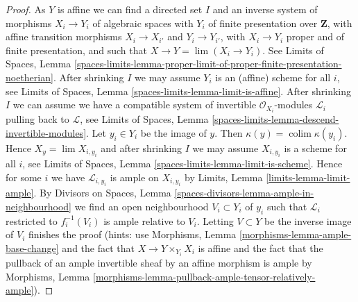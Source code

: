 \documentclass[10pt,a4paper]{amsart}
\theoremstyle{plain}
\theoremstyle{definition}
\theoremstyle{remark}
\numberwithin{equation}{subsection}
\def\lim{\mathop{\mathrm{lim}}\nolimits}
\def\colim{\mathop{\mathrm{colim}}\nolimits}
\begin{document}
\begin{proof}
\medskip\noindent
As $Y$ is affine we can find a directed set $I$ and an
inverse system of morphisms $X_i \to Y_i$ of algebraic spaces
with $Y_i$ of finite presentation over $\mathbf{Z}$, with affine
transition morphisms $X_i \to X_{i'}$ and $Y_i \to Y_{i'}$,
with $X_i \to Y_i$ proper and of finite presentation, and such that
$X \to Y = \lim (X_i \to Y_i)$. See Limits of Spaces, Lemma
\ref{spaces-limits-lemma-proper-limit-of-proper-finite-presentation-noetherian}.
After shrinking $I$ we may assume $Y_i$ is an (affine) scheme for all $i$,
see Limits of Spaces, Lemma \ref{spaces-limits-lemma-limit-is-affine}.
After shrinking $I$ we can assume we have a compatible system of
invertible $\mathcal{O}_{X_i}$-modules $\mathcal{L}_i$
pulling back to $\mathcal{L}$, see
Limits of Spaces, Lemma \ref{spaces-limits-lemma-descend-invertible-modules}.
Let $y_i \in Y_i$ be the image of $y$.
Then $\kappa(y) = \colim \kappa(y_i)$.
Hence $X_y = \lim X_{i, y_i}$ and after shrinking $I$ we
may assume $X_{i, y_i}$ is a scheme for all $i$, see
Limits of Spaces, Lemma \ref{spaces-limits-lemma-limit-is-scheme}.
Hence for some $i$ we have $\mathcal{L}_{i, y_i}$
is ample on $X_{i, y_i}$ by
Limits, Lemma \ref{limits-lemma-limit-ample}.
By Divisors on Spaces, Lemma \ref{spaces-divisors-lemma-ample-in-neighbourhood}
we find an open neighbourhood
$V_i \subset Y_i$ of $y_i$ such that
$\mathcal{L}_i$ restricted to $f_i^{-1}(V_i)$
is ample relative to $V_i$.
Letting $V \subset Y$ be the inverse image of
$V_i$ finishes the proof (hints: use
Morphisms, Lemma \ref{morphisms-lemma-ample-base-change} and
the fact that $X \to Y \times_{Y_i} X_i$ is affine
and the fact that the pullback of an
ample invertible sheaf by an affine morphism is ample by
Morphisms, Lemma \ref{morphisms-lemma-pullback-ample-tensor-relatively-ample}).
\end{proof}
\end{document}
